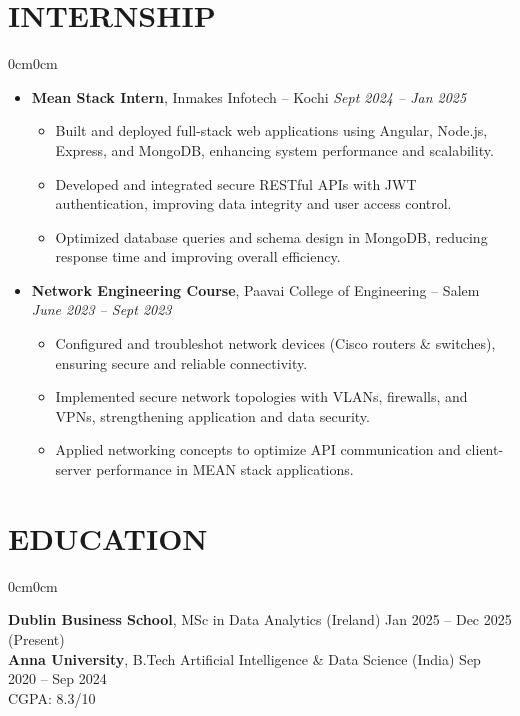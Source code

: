 \documentclass[10pt, letterpaper]{article}
\newenvironment{highlights}{
    \begin{itemize}[
        topsep=0.10cm,
        parsep=0.10cm,
        partopsep=0pt,
        itemsep=0pt,
        leftmargin=10pt
    ]
}{
    \end{itemize}
}
\newenvironment{onecolentry}{
    \begin{adjustwidth}{0cm}{0cm}
}{
    \end{adjustwidth}
}
\begin{document}
    \section{INTERNSHIP}
    \begin{onecolentry}
        \begin{highlights}
            \item \textbf{Mean Stack Intern}, Inmakes Infotech -- Kochi \hfill \emph{Sept 2024 – Jan 2025}
            \begin{itemize}[leftmargin=15pt]
                \item Built and deployed full-stack web applications using Angular, Node.js, Express, and MongoDB, enhancing system performance and scalability.
                \item Developed and integrated secure RESTful APIs with JWT authentication, improving data integrity and user access control.
                \item Optimized database queries and schema design in MongoDB, reducing response time and improving overall efficiency.
            \end{itemize}
            \item \textbf{Network Engineering Course}, Paavai College of Engineering -- Salem \hfill \emph{June 2023 – Sept 2023}
            \begin{itemize}[leftmargin=15pt]
                \item Configured and troubleshot network devices (Cisco routers \& switches), ensuring secure and reliable connectivity.
                \item Implemented secure network topologies with VLANs, firewalls, and VPNs, strengthening application and data security.
                \item Applied networking concepts to optimize API communication and client-server performance in MEAN stack applications.
            \end{itemize}
        \end{highlights}
    \end{onecolentry}

    \section{EDUCATION}
    \begin{onecolentry}
        \textbf{Dublin Business School}, MSc in Data Analytics (Ireland) \hfill Jan 2025 – Dec 2025 (Present)\\
        \textbf{Anna University}, B.Tech Artificial Intelligence \& Data Science (India) \hfill Sep 2020 – Sep 2024\\
        CGPA: 8.3/10
    \end{onecolentry}
\end{document}
